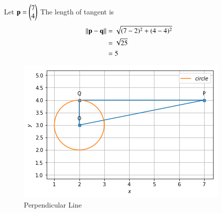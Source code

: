 Let $\mathbf{p} =\begin{pmatrix}7 \\ 4\end{pmatrix}$
The length of tangent is 
\begin{align}
	\left\lVert\mathbf{p}-\mathbf{q}\right\rVert&= \sqrt{(7-2)^2 + (4-4)^2}\\
	&=\sqrt{25}\\
	&=5
\end{align}
\begin{figure}[!htbp]
 	\centering
 	\includegraphics[width =\columnwidth]{./solutions/4/2/7/circle.png}
 	\caption{Perpendicular Line }
 	\label{eq:solutions/4/2/7/fig:1}
\end{figure}	

